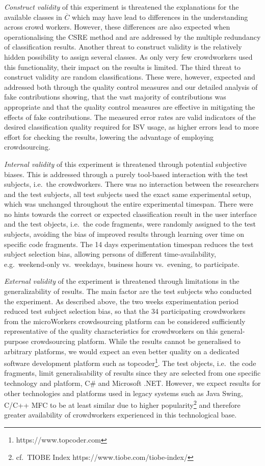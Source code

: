 \emph{Construct validity} of this experiment is threatened the explanations for the available classes in \(\overline C\) which may have lead to differences in the understanding across crowd workers.
However, these differences are also expected when operationalising the CSRE method and are addressed by the multiple redundancy of classification results.
Another threat to construct validity is the relatively hidden possibility to assign several classes.
As only very few crowdworkers used this functionality, their impact on the results is limited.
The third threat to construct validity are random classifications.
These were, however, expected and addressed both through the quality control measures and our detailed analysis of fake contributions showing, that the vast majority of contributions was appropriate and that the quality control measures are effective in mitigating the effects of fake contributions.
The measured error rates are valid indicators of the desired classification quality required for ISV usage, as higher errors lead to more effort for checking the results, lowering the advantage of employing crowdsourcing.

\emph{Internal validity} of this experiment is threatened through potential subjective biases.
This is addressed through a purely tool-based interaction with the test subjects, i.e.~the crowdworkers.
There was no interaction between the researchers and the test subjects, all test subjects used the exact same experimental setup, which was unchanged throughout the entire experimental timespan.
There were no hints towards the correct or expected classification result in the user interface and the test objects, i.e.~the code fragments, were randomly assigned to the test subjects, avoiding the bias of improved results through learning over time on specific code fragments.
The 14 days experimentation timespan reduces the test subject selection bias, allowing persons of different time-availability, e.g.~weekend-only vs.~weekdays, business hours vs.~evening, to participate.

\emph{External validity} of the experiment is threatened through limitations in the generalizability of results.
The main factor are the test subjects who conducted the experiment.
As described above, the two weeks experimentation period reduced test subject selection bias, so that the 34 participating crowdworkers from the microWorkers crowdsourcing platform can be considered sufficiently representative of the quality characteristics for crowdworkers on this general-purpose crowdsourcing platform.
While the results cannot be generalised to arbitrary platforms, we would expect an even better quality on a dedicated software development platform such as topcoder\footnote{https://www.topcoder.com}.
The test objects, i.e.~the code fragments, limit generalisability of results since they are selected from one specific technology and platform, C\# and Microsoft .NET.
However, we expect results for other technologies and platforms used in legacy systems such as Java Swing, C/C++ MFC to be at least similar due to higher popularity\footnote{cf.~TIOBE Index https://www.tiobe.com/tiobe-index/} and therefore greater availability of crowdworkers experienced in this technological base.

